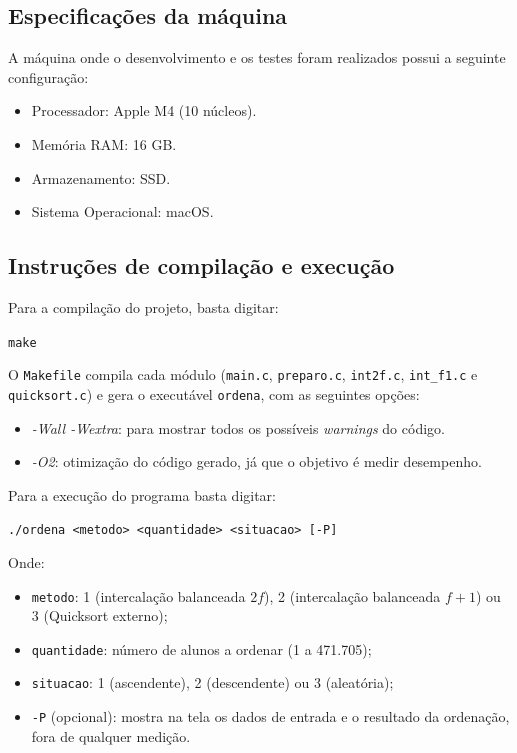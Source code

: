 \documentclass{article}
\begin{document}
\subsection{Especificações da máquina}
\label{sec:maquina}
A máquina onde o desenvolvimento e os testes foram realizados possui a seguinte configuração:
\begin{itemize}
    \item[-] Processador: Apple M4 (10 núcleos).
    \item[-] Memória RAM: 16 GB.
    \item[-] Armazenamento: SSD.
    \item[-] Sistema Operacional: macOS.
\end{itemize}

\subsection{Instruções de compilação e execução}

Para a compilação do projeto, basta digitar:

\begin{tcolorbox}[title=Compilando o projeto,width=\linewidth]
    \texttt{make}
\end{tcolorbox}

O \texttt{Makefile} compila cada módulo (\texttt{main.c}, \texttt{preparo.c}, \texttt{int2f.c}, \texttt{int\_f1.c} e \texttt{quicksort.c}) e gera o executável \texttt{ordena}, com as seguintes opções:
\begin{itemize}
    \item [-] \emph{-Wall -Wextra}: para mostrar todos os possíveis \emph{warnings} do código.
    \item [-] \emph{-O2}: otimização do código gerado, já que o objetivo é medir desempenho.
\end{itemize}

Para a execução do programa basta digitar:
\begin{tcolorbox}[title=Executando o programa,width=\linewidth]
    \texttt{./ordena \textless metodo\textgreater{} \textless quantidade\textgreater{} \textless situacao\textgreater{} [-P]}
\end{tcolorbox}

Onde:
\begin{itemize}
    \item [-] \texttt{metodo}: 1 (intercalação balanceada $2f$), 2 (intercalação balanceada $f+1$) ou 3 (Quicksort externo);
    \item [-] \texttt{quantidade}: número de alunos a ordenar (1 a 471.705);
    \item [-] \texttt{situacao}: 1 (ascendente), 2 (descendente) ou 3 (aleatória);
    \item [-] \texttt{-P} (opcional): mostra na tela os dados de entrada e o resultado da ordenação, fora de qualquer medição.
\end{itemize}
\end{document}
